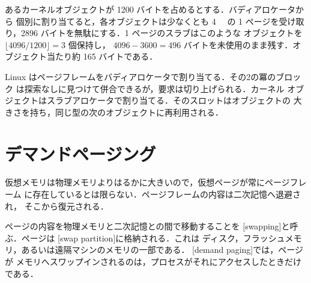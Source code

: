\documentclass[../main.tex]{subfiles}
\begin{document}
\begin{example}
  あるカーネルオブジェクトが 1200 バイトを占めるとする．バディアロケータから
  個別に割り当てると，各オブジェクトは少なくとも \SI{4}{\kibi\byte} の 1
  ページを受け取り，2896 バイトを無駄にする．1 ページのスラブはこのような
  オブジェクトを $\lfloor 4096/1200 \rfloor = 3$ 個保持し，
  $4096 - 3600 = 496$ バイトを未使用のまま残す．オブジェクト当たり約 165
  バイトである．
\end{example}

\begin{keypoint}
  Linux はページフレームをバディアロケータで割り当てる．その2の冪のブロック
  は探索なしに見つけて併合できるが，要求は切り上げられる．カーネル
  オブジェクトはスラブアロケータで割り当てる．そのスロットはオブジェクトの
  大きさを持ち，同じ型の次のオブジェクトに再利用される．
\end{keypoint}

\section{デマンドページング}
\label{sec:l08-demand}

仮想メモリは物理メモリよりはるかに大きいので，仮想ページが常にページフレーム
に存在しているとは限らない．ページフレームの内容は二次記憶へ退避され，
そこから復元される．

\begin{definition}[スワッピングとデマンドページング]
  ページの内容を物理メモリと二次記憶との間で移動することを
  [swapping]と呼ぶ．ページは
  [swap partition]に格納される．これは
  ディスク，フラッシュメモリ，あるいは遠隔マシンのメモリの一部である．
  [demand paging]では，ページが
  メモリへスワップインされるのは，プロセスがそれにアクセスしたときだけである．
\end{definition}
\end{document}
